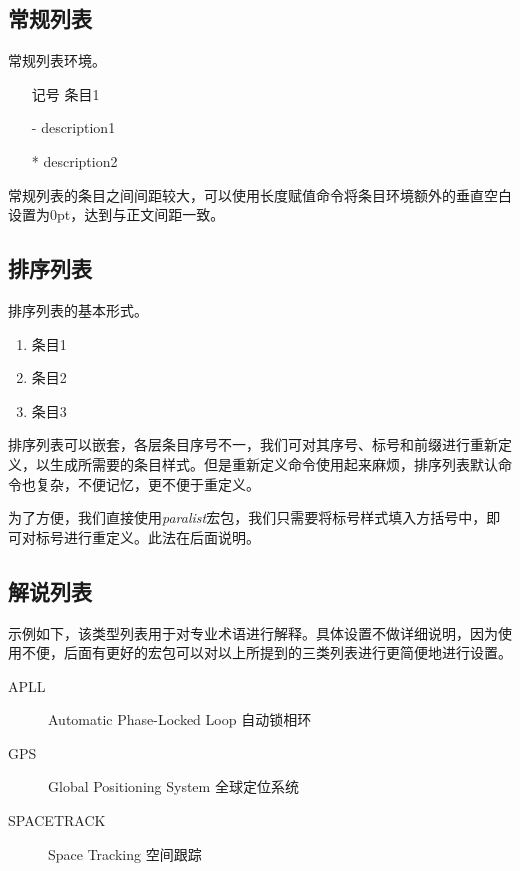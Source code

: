 \subsection{常规列表}
常规列表环境。

\begin{codeshow}
\begin{itemize}
	\item[记号] 条目1
	\item[-] description1
	\item[*] description2
\end{itemize}
\end{codeshow}

常规列表的条目之间间距较大，可以使用长度赋值命令将条目环境额外的垂直空白设置为0pt，达到与正文间距一致。

\begin{latex}
\itemsep=0pt
\parskip=0pt
\end{latex}

\subsection{排序列表}
排序列表的基本形式。

\begin{codeshow}
	\begin{enumerate}
		\item 条目1
		\item 条目2
		\item 条目3
	\end{enumerate}
\end{codeshow}

排序列表可以嵌套，各层条目序号不一，我们可对其序号、标号和前缀进行重新定义，以生成所需要的条目样式。但是重新定义命令使用起来麻烦，排序列表默认命令也复杂，不便记忆，更不便于重定义。

为了方便，我们直接使用\emph{paralist}宏包，我们只需要将标号样式填入方括号中，即可对标号进行重定义。此法在后面说明。

\subsection{解说列表}
示例如下，该类型列表用于对专业术语进行解释。具体设置不做详细说明，因为使用不便，后面有更好的宏包可以对以上所提到的三类列表进行更简便地进行设置。

\begin{codeshow}
	\begin{description}
		\item[APLL] 
		Automatic Phase-Locked Loop
		自动锁相环
		\item[GPS] Global 
		Positioning System 全球定位系统
		\item[SPACETRACK] 
		Space Tracking 空间跟踪
	\end{description}
\end{codeshow}

